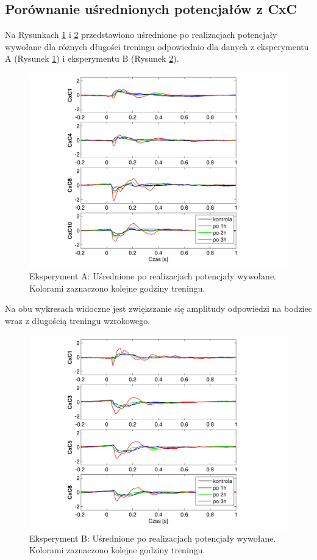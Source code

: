 \documentclass{pracamgr_2}
\begin{document}
	\subsection{Porównanie uśrednionych potencjałów z CxC}
	Na Rysunkach \ref{rys:kontrola15_CxC} i \ref{rys:beta3_CxC} przedstawiono uśrednione po realizacjach potencjały wywołane dla różnych długości treningu odpowiednio dla danych z eksperymentu A (Rysunek \ref{rys:kontrola15_CxC}) i eksperymentu B (Rysunek \ref{rys:beta3_CxC}).
	\begin{figure}[htbp]
		\begin{center}
			\includegraphics[scale=0.8]{kontrola15_CxC.png}
		\end{center}
		\caption{Eksperyment A: Uśrednione po realizacjach potencjały wywołane. Kolorami zaznaczono kolejne godziny treningu.}
		\label{rys:kontrola15_CxC}
	\end{figure}
	\FloatBarrier
	Na obu wykresach widoczne jest zwiększanie się amplitudy odpowiedzi na bodziec wraz z długością treningu wzrokowego.
	\begin{figure}[h]
		\begin{center}
			\includegraphics[scale=0.8]{beta3_CxC.png}
		\end{center}
		\caption{Eksperyment B: Uśrednione po realizacjach potencjały wywołane. Kolorami zaznaczono kolejne godziny treningu.}
		\label{rys:beta3_CxC}
	\end{figure}
\end{document}
